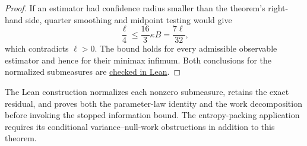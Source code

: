 \begin{proof}
If an estimator had confidence radius smaller than the theorem's
right-hand side, quarter smoothing and midpoint testing would give
\[
 \frac{\ell}{4}\le\frac{16}{3}\kappa B
 =\frac{7\ell}{32},
\]
which contradicts $\ell>0$. The bound holds for every admissible
observable estimator and hence for their minimax infimum.
Both conclusions for the normalized submeasures are
\href{https://github.com/davidiach/adaptive-threshold-estimation/blob/b64f44f43aa0bb2c43f83ad428a4bc9627a5f773/lean/ThresholdHC/AdditiveConfidence/Full.lean}{checked in Lean}.
\end{proof}

The Lean construction normalizes each nonzero submeasure, retains
the exact residual, and proves both the parameter-law identity and
the work decomposition before invoking the stopped information bound.
The entropy-packing application requires its conditional
variance--null-work obstructions in addition to this theorem.
